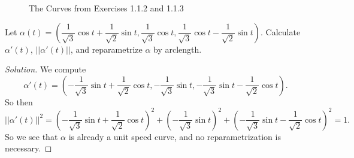 \documentclass[Shifrin_Solutions_Spring_2015]{subfiles}
\begin{document}
\begin{figure}[h]
\centering
{}
  \caption{The Curves from Exercises 1.1.2 and 1.1.3}
\end{figure}





\begin{exercise} Let
$\alpha (t) = \left( \dfrac{1}{\sqrt{3}} \cos t + \dfrac{1}{\sqrt{2}}\sin t , \dfrac{1}{\sqrt{3}}\cos t , \dfrac{1}{\sqrt{3}}\cos t - \dfrac{1}{\sqrt{2}}\sin t \right)$.
Calculate $\alpha'(t)$, $|| \alpha'(t)||$, and reparametrize $\alpha$ by arclength.
\end{exercise}

\begin{proof}[Solution]
We compute
\[
\alpha'(t) = \left(  -\dfrac{1}{\sqrt{3}}\sin t + \dfrac{1}{\sqrt{2}}\cos t ,
- \dfrac{1}{\sqrt{3}} \sin t ,
-\dfrac{1}{\sqrt{3}}\sin t - \dfrac{1}{\sqrt{2}}\cos t
\right) .
\]
So then
\[
||\alpha'(t)||^2 = \left( -\dfrac{1}{\sqrt{3}}\sin t + \dfrac{1}{\sqrt{2}}\cos t \right)^2 + \left( - \dfrac{1}{\sqrt{3}} \sin t \right)^2 + \left( -\dfrac{1}{\sqrt{3}}\sin t - \dfrac{1}{\sqrt{2}}\cos t \right)^2 = 1 .
\]
So we see that $\alpha$ is already a unit speed curve, and no reparametrization is necessary.
\end{proof}
\end{document}
